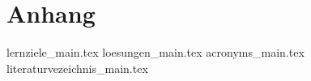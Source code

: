 
\part{Anhang}

{lernziele_main.tex}
{loesungen_main.tex}
{acronyms_main.tex}
{literaturvezeichnis_main.tex}